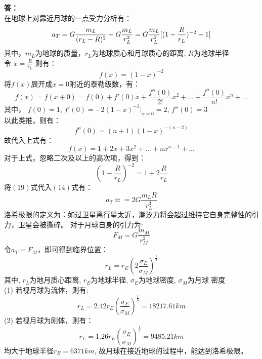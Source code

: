 \documentclass[12pt,a4paper]{article}
\begin{document}
\vspace{5pt}
\noindent
{\bf 答：} \\
在地球上对靠近月球的一点受力分析有：
\begin{equation}
    a_T = G \frac{m_L}{(r_L - R)^2} - G \frac{m_L}{r_L^2}  \\
    = G\frac{m_L}{r_L^2}[(1 - \frac{R}{r_L})^{-2} - 1]
\end{equation}
其中，$m_L$为地球的质量，$r_L$为地球质心和月球质心的距离, $R$为地球半径 \\
令 $x = \frac{R}{r_L}$
则有：
\begin{equation}
    f(x) = (1 - x)^{-2}
\end{equation}
将$f(x)$展开成$x=0$附近的泰勒级数，有：
\begin{equation}
    f(x) = f(x + 0) = f(0) + f'(0)x + \frac{f''(0)}{2!}x^2 + 
    ... + \frac{f^n(0)}{n!}x^n + ...
\end{equation}
其中， $f(0) = 1$, $f'(0) = -2(1-x)^{-3}|_{x=0} = 2$, $f''(0) = 3$ \\
以此类推，则有：
\begin{equation}
    f^n(0) = (n + 1) (1 - x)^{-(n - 2)}
\end{equation}
故代入上式有：
\begin{equation}
    f(x) = 1 + 2x + 3x^2 + ... + nx^{n-1} + ...
\end{equation}
对于上式，忽略二次及以上的高次项，得到：
\begin{equation}
    (1 - \frac{R}{r_L})^{-2} = 1 + 2\frac{R}{r_L}
\end{equation}
将$(19)$式代入$(14)$式有：
\begin{equation}
    a_T \approx = 2G \frac{m_L R}{r_L^3}
\end{equation}
洛希极限的定义为：如过卫星离行星太近，潮汐力将会超过维持它自身完整性的引力，卫星会被撕碎。
对于月球自身的引力为:
\begin{equation}
    F_M = G \frac{m_M}{r_M^2}
\end{equation}
令$a_T = F_M$，即可得到临界位置：
\begin{equation}
    r_L = r_E (2 \frac{\sigma_E}{\sigma_M})^{\frac{1}{3}}
\end{equation}
其中, $r_L$为地月质心距离, $r_E$为地球半径, 
$\sigma_E$为地球密度, $\sigma_M$为月球
密度 \\
(1) 若视月球为流体，则有:
\begin{equation}
    r_L = 2.42 r_E (\frac{\sigma_E}{\sigma_M})^{\frac{1}{3}} = 18217.61 km
\end{equation}
(2) 若视月球为刚体，则有：
\begin{equation}
    r_L = 1.26 r_E (\frac{\sigma_E}{\sigma_M})^{\frac{1}{3}} = 9485.21 km
\end{equation}
均大于地球半径$r_E = 6371km$, 故月球在接近地球的过程中，能达到洛希极限。
\end{document}
